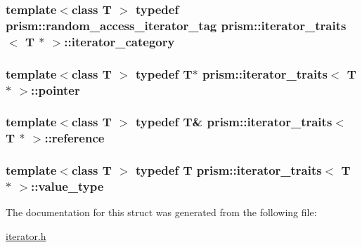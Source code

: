 \subsubsection[{\texorpdfstring{iterator\+\_\+category}{iterator_category}}]{\setlength{\rightskip}{0pt plus 5cm}template$<$class T $>$ typedef {\bf prism\+::random\+\_\+access\+\_\+iterator\+\_\+tag} {\bf prism\+::iterator\+\_\+traits}$<$ T $\ast$ $>$\+::{\bf iterator\+\_\+category}}\hypertarget{structprism_1_1iterator__traits_3_01_t_01_5_01_4_a493063ea0c7f896aef5a6979ad6da97c}{}\label{structprism_1_1iterator__traits_3_01_t_01_5_01_4_a493063ea0c7f896aef5a6979ad6da97c}
\subsubsection[{\texorpdfstring{pointer}{pointer}}]{\setlength{\rightskip}{0pt plus 5cm}template$<$class T $>$ typedef T$\ast$ {\bf prism\+::iterator\+\_\+traits}$<$ T $\ast$ $>$\+::{\bf pointer}}\hypertarget{structprism_1_1iterator__traits_3_01_t_01_5_01_4_a23fbd7c0b83a23804b00b3d9b77a09c5}{}\label{structprism_1_1iterator__traits_3_01_t_01_5_01_4_a23fbd7c0b83a23804b00b3d9b77a09c5}
\subsubsection[{\texorpdfstring{reference}{reference}}]{\setlength{\rightskip}{0pt plus 5cm}template$<$class T $>$ typedef T\& {\bf prism\+::iterator\+\_\+traits}$<$ T $\ast$ $>$\+::{\bf reference}}\hypertarget{structprism_1_1iterator__traits_3_01_t_01_5_01_4_add9024b705e4daf7ac40941cb160f786}{}\label{structprism_1_1iterator__traits_3_01_t_01_5_01_4_add9024b705e4daf7ac40941cb160f786}
\subsubsection[{\texorpdfstring{value\+\_\+type}{value_type}}]{\setlength{\rightskip}{0pt plus 5cm}template$<$class T $>$ typedef T {\bf prism\+::iterator\+\_\+traits}$<$ T $\ast$ $>$\+::{\bf value\+\_\+type}}\hypertarget{structprism_1_1iterator__traits_3_01_t_01_5_01_4_aba0237486c133218e1fe55040e667b42}{}\label{structprism_1_1iterator__traits_3_01_t_01_5_01_4_aba0237486c133218e1fe55040e667b42}


The documentation for this struct was generated from the following file\+:\begin{DoxyCompactItemize}
\item 
\hyperlink{iterator_8h}{iterator.\+h}\end{DoxyCompactItemize}
